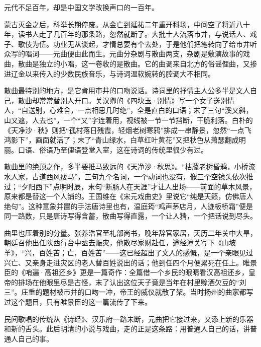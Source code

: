 
\begin{intro}
元代不足百年，却是中国文学改换声口的一百年。

蒙古灭金之后，科举长期停废。从金亡到延祐二年重开科场，中间空了将近八十年，读书人走了几百年的那条路，忽然就断了。大批士人流落市井，与说话人、戏子、歌伎为伍。功业无从谈起，才情总要有个去处，于是他们把笔转向了给市井听众写的唱词——元曲便由此而生。元曲分杂剧与散曲两支，杂剧是敷演故事的戏曲，散曲是独立的小唱，这一卷收的是散曲。它的曲调来自北方的俗谣俚曲，又掺进辽金以来传入的少数民族音乐，与诗词温软婉转的腔调大不相同。

散曲最特别的地方，是它肯用市井的口吻说话。诗词里的抒情主人公多半是文人自己，散曲却常常替别人开口。关汉卿的《四块玉·别情》写一个女子送别情人，“自送别，心难舍，一点相思几时绝”，全是直白的口语；末了三句“溪又斜，山又遮，人去也”，一个“又”字连着用，视线被一节一节挡断，干脆利落。白朴的《天净沙·秋》则把“孤村落日残霞，轻烟老树寒鸦”排成一串静景，忽然“一点飞鸿影下”，画面就活了；末了“青山绿水，白草红叶黄花”又把秋色从萧瑟翻成明丽。口语、俗语乃至俚语登堂入室，这在诗词的传统里很少有过。

散曲里的绝顶之作，多半要推马致远的《天净沙·秋思》。“枯藤老树昏鸦，小桥流水人家，古道西风瘦马”，三句九个名词，一个动词也没有，像三个空镜头依次推过；“夕阳西下”点明时辰，末句“断肠人在天涯”才让人出场——前面的草木风景，原来都是替这一个人铺的。王国维在《宋元戏曲史》里说它“纯是天籁，仿佛唐人绝句”。这种意象并置的手法唐诗里也有，温庭筠“鸡声茅店月，人迹板桥霜”便是同一路数，只是唐诗写得含蓄，散曲写得直露，一个让人猜，一个把话说到尽头。

曲里也压着别的分量。张养浩官至礼部尚书，晚年辞官家居，天历二年关中大旱，朝廷召他出任陕西行台中丞去赈灾，他散尽家财赴任，途经潼关写下《山坡羊》，“兴，百姓苦；亡，百姓苦”——这已经超出了文人的感慨，是一个亲眼见过兴亡、又亲身走进灾区的老人替百姓说出的话；他到任四个月便累死在任上。睢景臣的《哨遍·高祖还乡》更是一篇奇作：全篇借一个乡民的眼睛看汉高祖还乡，皇帝的排场在他眼里尽是古怪，末了认出这位天子竟是当年在村里赊酒欠豆的“刘三”。庄重的题材被市井的口吻一冲，帝王的威仪就散了架。当时扬州的曲家都写过这个题目，只有睢景臣的这一篇流传了下来。

民间歌唱的传统从《诗经》、汉乐府一路未断，元曲把它接过来，又添上新的乐器和新的舌头。此后明清的小说与戏曲，走的正是这条路：用普通人自己的话，讲普通人自己的事。
\end{intro}
